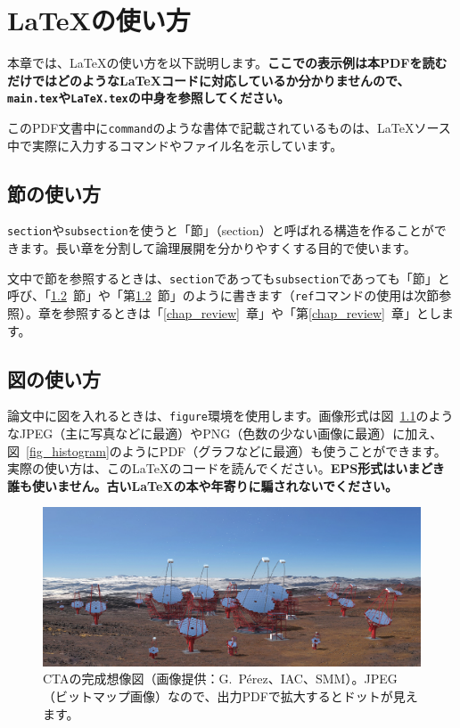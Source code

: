 \chapter{\LaTeX{}の使い方}
本章では、\LaTeX{}の使い方を以下説明します。\textbf{\textsf{ここでの表示例は本PDFを読むだけではどのような\LaTeX{}コードに対応しているか分かりませんので、\texttt{main.tex}や\texttt{LaTeX.tex}の中身を参照してください。}}

このPDF文書中に\texttt{command}のような書体で記載されているものは、\LaTeX{}ソース中で実際に入力するコマンドやファイル名を示しています。

\section{節の使い方}
\texttt{\bs{}section}や\texttt{\bs{}subsection}を使うと「節」（section）と呼ばれる構造を作ることができます。長い章を分割して論理展開を分かりやすくする目的で使います。

文中で節を参照するときは、\texttt{section}であっても\texttt{subsection}であっても「節」と呼び、「\ref{sec_figure}~節」や「第\ref{sec_figure}~節」のように書きます（\texttt{ref}コマンドの使用は次節参照）。章を参照するときは「\ref{chap_review}~章」や「第\ref{chap_review}~章」とします。

\section{図の使い方}
\label{sec_figure} %

論文中に図を入れるときは、\texttt{figure}環境を使用します。画像形式は図~\ref{fig_CTA}のようなJPEG（主に写真などに最適）やPNG（色数の少ない画像に最適）に加え、図~\ref{fig_histogram}のようにPDF（グラフなどに最適）も使うことができます。実際の使い方は、この\LaTeX{}のコードを読んでください。\textsf{\textbf{EPS形式はいまどき誰も使いません。古い\LaTeX{}の本や年寄りに騙されないでください。}}

\begin{figure} %
  \centering
  \includegraphics[width=14cm]{fig/CTA.jpg}
  \caption[CTAの完成想像図]{CTAの完成想像図（画像提供：G.~Pérez、IAC、SMM）。JPEG（ビットマップ画像）なので、出力PDFで拡大するとドットが見えます。}
  \label{fig_CTA}
\end{figure}

